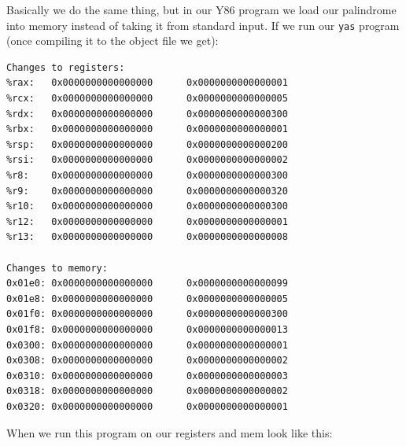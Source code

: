 \documentclass{article}
\begin{document}
Basically we do the same thing, but in our Y86 program we load our palindrome into memory instead of taking it from standard input. If we run our \verb+yas+ program (once compiling it to the object file we get):
\begin{verbatim}
Changes to registers:
%rax:   0x0000000000000000      0x0000000000000001
%rcx:   0x0000000000000000      0x0000000000000005
%rdx:   0x0000000000000000      0x0000000000000300
%rbx:   0x0000000000000000      0x0000000000000001
%rsp:   0x0000000000000000      0x0000000000000200
%rsi:   0x0000000000000000      0x0000000000000002
%r8:    0x0000000000000000      0x0000000000000300
%r9:    0x0000000000000000      0x0000000000000320
%r10:   0x0000000000000000      0x0000000000000300
%r12:   0x0000000000000000      0x0000000000000001
%r13:   0x0000000000000000      0x0000000000000008

Changes to memory:
0x01e0: 0x0000000000000000      0x0000000000000099
0x01e8: 0x0000000000000000      0x0000000000000005
0x01f0: 0x0000000000000000      0x0000000000000300
0x01f8: 0x0000000000000000      0x0000000000000013
0x0300: 0x0000000000000000      0x0000000000000001
0x0308: 0x0000000000000000      0x0000000000000002
0x0310: 0x0000000000000000      0x0000000000000003
0x0318: 0x0000000000000000      0x0000000000000002
0x0320: 0x0000000000000000      0x0000000000000001
\end{verbatim}
When we run this program on our registers and mem look like this:
\end{document}
